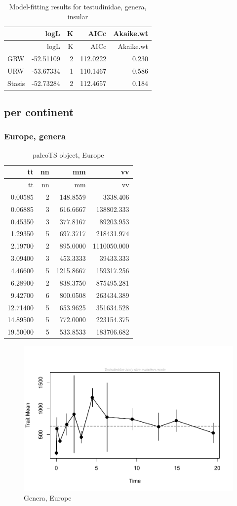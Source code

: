 \documentclass[]{article}
\begin{document}
\begin{longtable}[]{@{}lrrrr@{}}
\caption{Model-fitting results for testudinidae, genera,
insular}\tabularnewline
\toprule
& logL & K & AICc & Akaike.wt\tabularnewline
\midrule
\endfirsthead
\toprule
& logL & K & AICc & Akaike.wt\tabularnewline
\midrule
\endhead
GRW & -52.51109 & 2 & 112.0222 & 0.230\tabularnewline
URW & -53.67334 & 1 & 110.1467 & 0.586\tabularnewline
Stasis & -52.73284 & 2 & 112.4657 & 0.184\tabularnewline
\bottomrule
\end{longtable}

\newpage

\subsection{per continent}\label{per-continent}

\subsubsection{Europe, genera}\label{europe-genera}

\begin{longtable}[]{@{}rrrr@{}}
\caption{paleoTS object, Europe}\tabularnewline
\toprule
tt & nn & mm & vv\tabularnewline
\midrule
\endfirsthead
\toprule
tt & nn & mm & vv\tabularnewline
\midrule
\endhead
0.00585 & 2 & 148.8559 & 3338.406\tabularnewline
0.06885 & 3 & 616.6667 & 138802.333\tabularnewline
0.45350 & 3 & 377.8167 & 89203.953\tabularnewline
1.29350 & 5 & 697.3717 & 218431.974\tabularnewline
2.19700 & 2 & 895.0000 & 1110050.000\tabularnewline
3.09400 & 3 & 453.3333 & 39433.333\tabularnewline
4.46600 & 5 & 1215.8667 & 159317.256\tabularnewline
6.28900 & 2 & 838.3750 & 875495.281\tabularnewline
9.42700 & 6 & 800.0508 & 263434.389\tabularnewline
12.71400 & 5 & 653.9625 & 351634.528\tabularnewline
14.89500 & 5 & 772.0000 & 223154.375\tabularnewline
19.50000 & 5 & 533.8533 & 183706.682\tabularnewline
\bottomrule
\end{longtable}

\begin{figure}[htbp]
\centering
\includegraphics{MA_JJ_files/figure-latex/paleoTSEurope-1.pdf}
\caption{Genera, Europe}
\end{figure}
\end{document}
